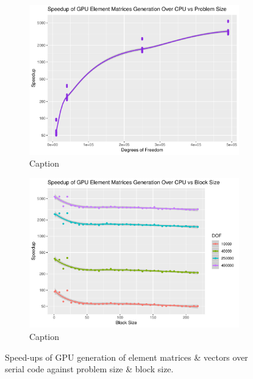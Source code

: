 \begin{figure}
	\centering
	\begin{subfigure}{0.48\linewidth}
		\centering
		\includegraphics[width = \linewidth]{Plots/elem_mats_dev_cpu_speedup_vs_n}
		\caption{Caption}
		\label{fig:elems_n}
	\end{subfigure}\hfill
	\begin{subfigure}{0.48\linewidth}
		\centering
		\includegraphics[width=\linewidth]{Plots/elem_mats_dev_cpu_speedup_vs_b}
		\caption{Caption}
		\label{fig:elems_b}
	\end{subfigure}
	\caption{Speed-ups of GPU generation of element matrices \& vectors over serial code against problem size \& block size.}
	\label{fig:elem_mats_gen}
\end{figure}

